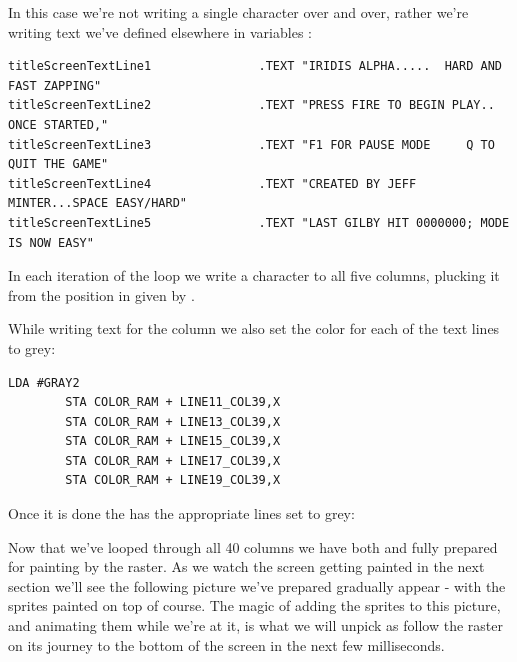 In this case we're not writing a single character over and over, rather we're writing text we've defined elsewhere
in variables :

\begin{lstlisting}[basicstyle=\tiny,caption=In \icode{DrawTitleScreenText}]
titleScreenTextLine1               .TEXT "IRIDIS ALPHA.....  HARD AND FAST ZAPPING"
titleScreenTextLine2               .TEXT "PRESS FIRE TO BEGIN PLAY.. ONCE STARTED,"
titleScreenTextLine3               .TEXT "F1 FOR PAUSE MODE     Q TO QUIT THE GAME"
titleScreenTextLine4               .TEXT "CREATED BY JEFF MINTER...SPACE EASY/HARD"
titleScreenTextLine5               .TEXT "LAST GILBY HIT 0000000; MODE IS NOW EASY"
\end{lstlisting}

In each iteration of the loop we write a character to all five columns, plucking it from the position in
 given by . 



While writing text for the column we also set the color for each of the text lines to grey:

\begin{lstlisting}[caption=In \icode{DrawTitleScreenText}]
        LDA #GRAY2
        STA COLOR_RAM + LINE11_COL39,X
        STA COLOR_RAM + LINE13_COL39,X
        STA COLOR_RAM + LINE15_COL39,X
        STA COLOR_RAM + LINE17_COL39,X
        STA COLOR_RAM + LINE19_COL39,X
\end{lstlisting}

Once it is done the  has the appropriate lines set to grey:


Now that we've looped through all 40 columns we have both  and  fully
prepared for painting by the raster. As we watch the screen getting painted in the next section we'll see
the following picture we've prepared gradually appear - with the sprites painted on top of course. The
magic of adding the sprites to this picture, and animating them while we're at it, is what we will
unpick as follow the raster on its journey to the bottom of the screen in the next few milliseconds.

